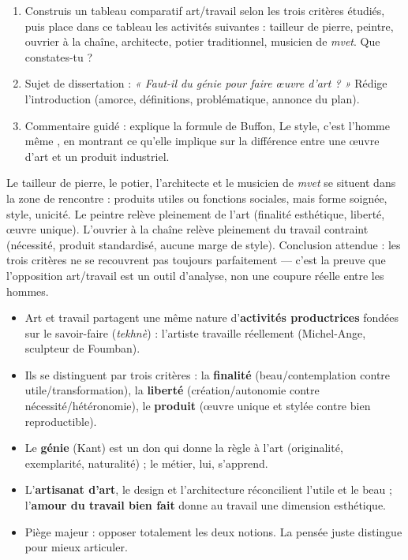 \documentclass[11pt]{article}
\begin{document}
\begin{exercice}
\begin{enumerate}
\item Construis un tableau comparatif art/travail selon les trois critères étudiés, puis place dans ce tableau les activités suivantes : tailleur de pierre, peintre, ouvrier à la chaîne, architecte, potier traditionnel, musicien de \emph{mvet}. Que constates-tu ?
\item Sujet de dissertation : \emph{« Faut-il du génie pour faire œuvre d'art ? »} Rédige l'introduction (amorce, définitions, problématique, annonce du plan).
\item Commentaire guidé : explique la formule de Buffon, \guillemotleft Le style, c'est l'homme même \guillemotright, en montrant ce qu'elle implique sur la différence entre une œuvre d'art et un produit industriel.
\end{enumerate}
\end{exercice}

\begin{corrige}[Exercice 1]
Le tailleur de pierre, le potier, l'architecte et le musicien de \emph{mvet} se situent dans la zone de rencontre : produits utiles ou fonctions sociales, mais forme soignée, style, unicité. Le peintre relève pleinement de l'art (finalité esthétique, liberté, œuvre unique). L'ouvrier à la chaîne relève pleinement du travail contraint (nécessité, produit standardisé, aucune marge de style). Conclusion attendue : les trois critères ne se recouvrent pas toujours parfaitement — c'est la preuve que l'opposition art/travail est un outil d'analyse, non une coupure réelle entre les hommes.
\end{corrige}

\begin{aretenir}
\begin{itemize}
\item Art et travail partagent une même nature d'\textbf{activités productrices} fondées sur le savoir-faire (\emph{tekhnè}) : l'artiste travaille réellement (Michel-Ange, sculpteur de Foumban).
\item Ils se distinguent par trois critères : la \textbf{finalité} (beau/contemplation contre utile/transformation), la \textbf{liberté} (création/autonomie contre nécessité/hétéronomie), le \textbf{produit} (œuvre unique et stylée contre bien reproductible).
\item Le \textbf{génie} (Kant) est un don qui \guillemotleft donne la règle à l'art \guillemotright (originalité, exemplarité, naturalité) ; le métier, lui, s'apprend.
\item L'\textbf{artisanat d'art}, le design et l'architecture réconcilient l'utile et le beau ; l'\textbf{amour du travail bien fait} donne au travail une dimension esthétique.
\item Piège majeur : opposer totalement les deux notions. La pensée juste distingue pour mieux articuler.
\end{itemize}
\end{aretenir}
\end{document}
